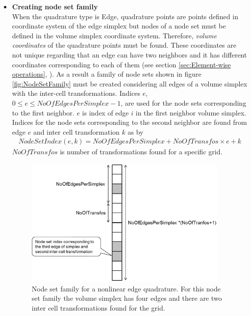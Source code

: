 \documentclass[BoSSSForSolvingConservationLaws.tex]{subfiles}
\begin{document}
\begin{itemize}
\item \textbf{Creating node set family}\\
When the quadrature type is Edge, quadrature points are points defined in coordinate system of the edge simplex but nodes of a node set must be defined in the volume simplex coordinate system. Therefore,  \emph{volume coordinates} of the quadrature points must be found. These coordinates are not unique regarding that an edge can have two neighbors and it has different coordinates corresponding to each of them (see section \ref{sec:Element-wise operations}, ). As a result a family of node sets shown in figure \ref{fig:NodeSetFamily} must be created considering all edges of a volume simplex with the inter-cell transformations. Indices $e$, $0\leq e \leq NoOfEdgesPerSimplex-1$, are used for the node sets corresponding to the first neighbor. $e$ is index of edge $i$ in the first neighbor volume simplex. Indices for the node sets corresponding to the second neighbor are found from edge $e$ and inter cell transformation $k$ as by
\begin{align*}
 NodeSetIndex(e,k)=NoOfEdgesPerSimplex+NoOfTransfos\times e+k
\end{align*}
$NoOfTransfos$ is number of transformations found for a specific grid.
\begin{figure}[h]
\begin{center}
\includegraphics[width=10cm]{Figures/NodeSetFamily}
\end{center}
\caption{Node set family for a nonlinear edge quadrature. For this node set family the volume simplex has four edges and there are two inter cell transformations found for the grid.}

\end{figure}
\end{itemize}
\end{document}
